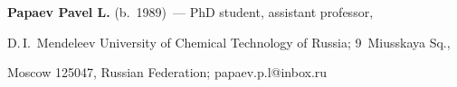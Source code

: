   


  \noindent


  \textbf{Papaev Pavel L.} (b.\ 1989)~--- PhD student, assistant professor, 


D.\,I.~Mendeleev University of Chemical Technology of Russia; 9~Miusskaya Sq., 


Moscow 125047, Russian Federation; papaev.p.l@inbox.ru


  


  


  


\label{end\stat}








\renewcommand{\bibname}{\protect\rm Литература}  


